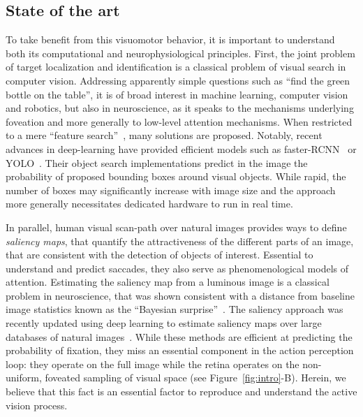 %
\subsection*{State of the art}

To take benefit from this visuomotor behavior, it is important to understand both its computational and neurophysiological principles. First, the joint problem of target localization and identification is a classical problem of visual search in computer vision. Addressing apparently simple questions such as ``find the green bottle on the table'', it is of broad interest in machine learning, computer vision and robotics, but also in neuroscience, as it speaks to the mechanisms underlying foveation and more generally to low-level attention mechanisms.
When restricted to a mere ``feature search''~\cite{Treisman80}, many solutions are proposed. Notably, recent advances in deep-learning have provided efficient models such as faster-RCNN~\cite{Ren17} or YOLO~\cite{Redmon15}.
Their object search implementations predict in the image the probability of proposed bounding boxes around visual objects. While rapid, the number of boxes may significantly increase with image size and the approach more generally necessitates dedicated hardware to run in real time.

In parallel, human visual scan-path over natural images provides ways to define \emph{saliency maps}, that quantify the attractiveness of the different parts of an image, that are consistent with the detection of objects of interest. Essential to understand and predict saccades, they also serve as phenomenological models of attention. Estimating the saliency map from  a luminous image is a classical problem in neuroscience, that was shown consistent with a distance from baseline image statistics known as the ``Bayesian surprise''~\cite{Itti01}. The saliency approach was recently updated using deep learning to estimate saliency maps over large databases of natural images~\cite{Kummerer16}.
While these methods are efficient at predicting the probability of fixation, they miss an essential component in the action perception loop: they operate on the full image while the retina operates on the non-uniform, foveated sampling of visual space (see Figure~\ref{fig:intro}-B).
Herein, we believe that this fact is an essential factor to reproduce and understand the active vision process.

